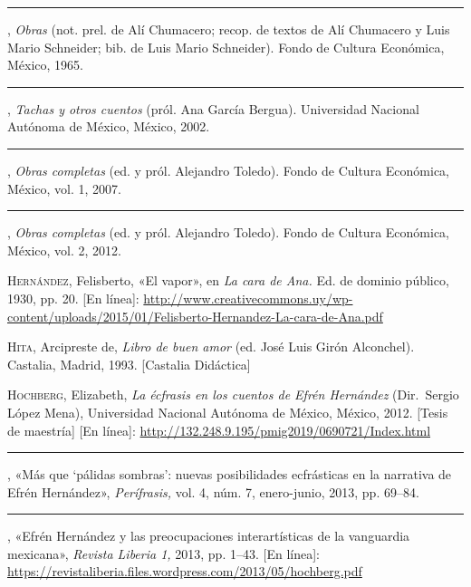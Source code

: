 \documentclass[14pt,twoside,final]{extbook} %
\begin{document}
\rule{1cm}{0.4pt}, \emph{Obras} (not. prel. de Alí Chumacero; recop. de textos de Alí Chumacero y Luis Mario Schneider; bib. de Luis Mario Schneider). Fondo de Cultura Económica, México, 1965.\label{bib:hernandez1965}

\rule{1cm}{0.4pt}, \emph{Tachas y otros cuentos} (pról. Ana García Bergua). Universidad Nacional Autónoma de México, México, 2002.\label{bib:hernandez2002}

\rule{1cm}{0.4pt}, \emph{Obras completas} (ed. y pról. Alejandro Toledo). Fondo de Cultura Económica, México, vol. 1, 2007.\label{bib:hernandez2007}

\rule{1cm}{0.4pt}, \emph{Obras completas} (ed. y pról. Alejandro Toledo). Fondo de Cultura Económica, México, vol. 2, 2012.\label{bib:hernandez2012}

\textsc{Hernández}, Felisberto, «El vapor», en \emph{La cara de Ana.} Ed. de dominio público, 1930, pp. 20. [En línea]: \href{http://www.creativecommons.uy/wp-content/uploads/2015/01/Felisberto-Hernandez-La-cara-de-Ana.pdf}{http://www.creativecommons.uy/wp-content/uploads/2015/01/Felisberto-Hernandez-La-cara-de-Ana.pdf}\label{fhernandez1930}

\textsc{Hita}, Arcipreste de, \emph{Libro de buen amor} (ed. José Luis Girón Alconchel). Castalia, Madrid, 1993. [Castalia Didáctica]\label{bib:hita1993}

\textsc{Hochberg}, Elizabeth, \emph{La écfrasis en los cuentos de Efrén Hernández} (Dir.~Sergio López Mena), Universidad Nacional Autónoma de México, México, 2012. [Tesis de maestría] [En línea]: \url{http://132.248.9.195/pmig2019/0690721/Index.html}\label{bib:hochberg2012}

\rule{1cm}{0.4pt}, «Más que `pálidas sombras': nuevas posibilidades ecfrásticas en la narrativa de Efrén Hernández», \emph{Perífrasis,} vol. 4, núm. 7, enero-junio, 2013, pp. 69--84.\label{bib:hochberg2013a}

\rule{1cm}{0.4pt}, «Efrén Hernández y las preocupaciones interartísticas de la vanguardia mexicana», \emph{Revista Liberia 1,} 2013, pp. 1--43. [En línea]: \url{https://revistaliberia.files.wordpress.com/2013/05/hochberg.pdf}\label{bib:hochberg2013b}
\end{document}
